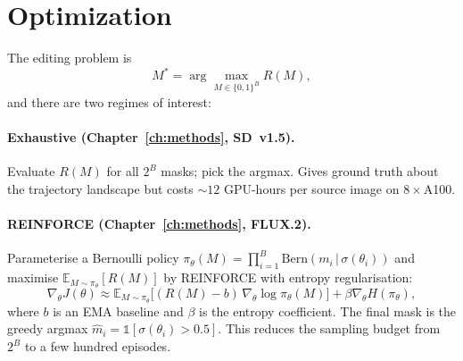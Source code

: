 \section{Optimization}

The editing problem is
\begin{equation}
    M^* = \arg\max_{M \in \{0,1\}^B} R(M),
    \label{eq::objective}
\end{equation}
and there are two regimes of interest:

\paragraph{Exhaustive (Chapter~\ref{ch:methods}, SD~v1.5).} Evaluate $R(M)$ for all $2^B$ masks; pick the argmax. Gives ground truth about the trajectory landscape but costs ${\sim}12$ GPU-hours per source image on $8\times$A100.

\paragraph{REINFORCE (Chapter~\ref{ch:methods}, FLUX.2).} Parameterise a Bernoulli policy $\pi_\theta(M)=\prod_{i=1}^{B}\text{Bern}(m_i\,|\,\sigma(\theta_i))$ and maximise $\mathbb{E}_{M\sim\pi_\theta}[R(M)]$ by REINFORCE with entropy regularisation:
\begin{equation}
\nabla_\theta J(\theta) \approx \mathbb{E}_{M\sim\pi_\theta}\bigl[(R(M)-b)\,\nabla_\theta \log \pi_\theta(M)\bigr] + \beta \nabla_\theta H(\pi_\theta),
\label{eq::reinforce_grad}
\end{equation}
where $b$ is an EMA baseline and $\beta$ is the entropy coefficient. The final mask is the greedy argmax $\hat{m}_i = \mathbb{1}[\sigma(\theta_i) > 0.5]$. This reduces the sampling budget from $2^B$ to a few hundred episodes.
